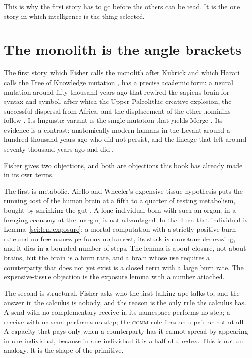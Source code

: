 \noindent
This is why the first story has to go before the others can be read. It is the one story in which intelligence is the thing selected.

\section{The monolith is the angle brackets}
\label{st:sec:monolith}

The first story, which Fisher calls the monolith after Kubrick and which Harari calls the Tree of Knowledge mutation \cite{harari2014}, has a precise academic form: a neural mutation around fifty thousand years ago that rewired the sapiens brain for syntax and symbol, after which the Upper Paleolithic creative explosion, the successful dispersal from Africa, and the displacement of the other hominins follow \cite{klein1995,baryosef2002,mellars2006}. Its linguistic variant is the single mutation that yields Merge \cite{berwick2016}. Its evidence is a contrast: anatomically modern humans in the Levant around a hundred thousand years ago who did not persist, and the lineage that left around seventy thousand years ago and did \cite{hershkovitz2018}.

Fisher gives two objections, and both are objections this book has already made in its own terms.

The first is metabolic. Aiello and Wheeler's expensive-tissue hypothesis puts the running cost of the human brain at a fifth to a quarter of resting metabolism, bought by shrinking the gut \cite{aiello1995}. A lone individual born with such an organ, in a foraging economy at the margin, is not advantaged. In the Turn that individual is Lemma~\ref{sci:lem:exposure}: a mortal computation with a strictly positive burn rate and no free names performs no harvest, its stack is monotone decreasing, and it dies in a bounded number of steps. The lemma is about closure, not about brains, but the brain is a burn rate, and a brain whose use requires a counterparty that does not yet exist is a closed term with a large burn rate. The expensive-tissue objection is the exposure lemma with a number attached.

The second is structural. Fisher asks who the first talking ape talks to, and the answer in the calculus is nobody, and the reason is the only rule the calculus has. A send with no complementary receive in its namespace performs no step; a receive with no send performs no step; the \textsc{comm} rule fires on a pair or not at all. A capacity that pays only when a counterparty has it cannot spread by appearing in one individual, because in one individual it is a half of a redex. This is not an analogy. It is the shape of the primitive.

